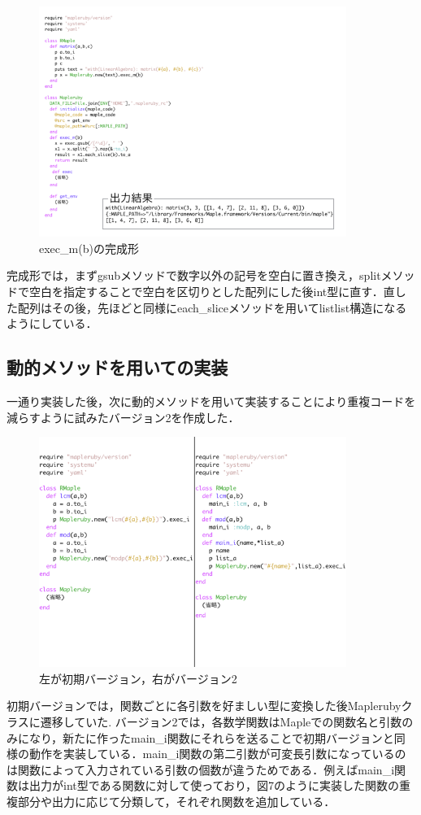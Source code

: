 \begin{figure}[htbp]\begin{center}
\includegraphics[width=10cm,bb= 0 0 737 553]{../figs/./mapleruby_eringi.005.png}
\caption{exec\_m(b)の完成形}
\label{default}\end{center}\end{figure}
完成形では，まずgsubメソッドで数字以外の記号を空白に置き換え，splitメソッドで空白を指定することで空白を区切りとした配列にした後int型に直す．直した配列はその後，先ほどと同様にeach\_sliceメソッドを用いてlistlist構造になるようにしている．

\subsection{動的メソッドを用いての実装}
一通り実装した後，次に動的メソッドを用いて実装することにより重複コードを減らすように試みたバージョン2を作成した．

\begin{figure}[htbp]\begin{center}
\includegraphics[width=10cm,bb= 0 0 737 553]{../figs/./mapleruby_eringi.006.png}
\caption{左が初期バージョン，右がバージョン2}
\label{default}\end{center}\end{figure}
初期バージョンでは，関数ごとに各引数を好ましい型に変換した後Maplerubyクラスに遷移していた.
バージョン2では，各数学関数はMapleでの関数名と引数のみになり，新たに作ったmain\_i関数にそれらを送ることで初期バージョンと同様の動作を実装している．main\_i関数の第二引数が可変長引数になっているのは関数によって入力されている引数の個数が違うためである．例えばmain\_i関数は出力がint型である関数に対して使っており，図7のように実装した関数の重複部分や出力に応じて分類して，それぞれ関数を追加している．

